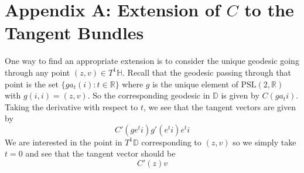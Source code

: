 \documentclass[]{article}
\begin{document}
\section*{Appendix A: Extension of $C$ to the Tangent Bundles}

One way to find an appropriate extension is to consider the unique geodesic going through any point $(z, v) \in T^1\mathbb{H}$.
Recall that the geodesic passing through that point is the set $\{ga_t(i): t\in \mathbb{R}\}$ where $g$ is the unique element of $\text{PSL}(2, \mathbb{R})$ with $g(i, i) = (z, v)$.
So the corresponding geodesic in $\mathbb{D}$ is given by $C(ga_ti)$.
Taking the derivative with respect to $t$, we see that the tangent vectors are given by
$$
C'(ge^ti)g'(e^ti)e^ti
$$
We are interested in the point in $T^1\mathbb{D}$ corresponding to $(z, v)$ so we simply take $t = 0$ and see that the tangent vector should be
$$
C'(z)v
$$
\end{document}
